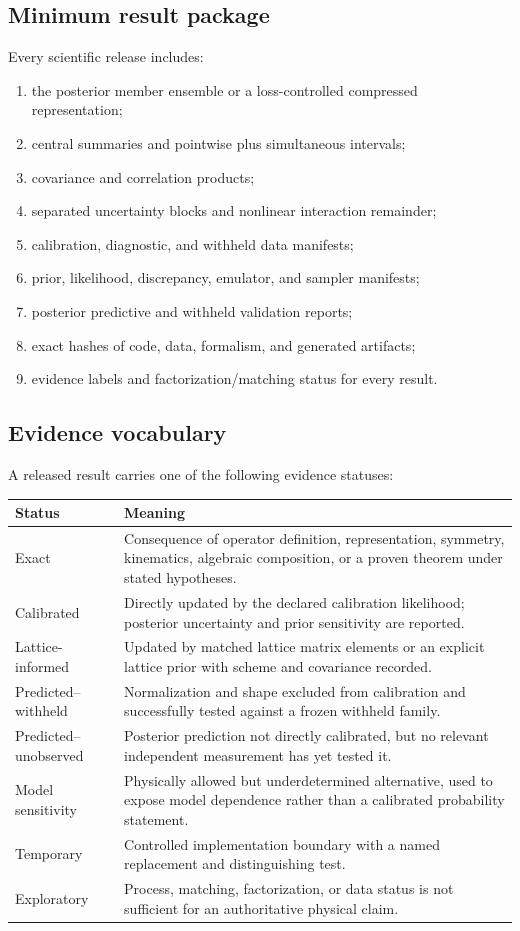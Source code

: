 \documentclass[11pt]{article}
\begin{document}
\subsection{Minimum result package}

Every scientific release includes:
\begin{enumerate}
\item the posterior member ensemble or a loss-controlled compressed
representation;
\item central summaries and pointwise plus simultaneous intervals;
\item covariance and correlation products;
\item separated uncertainty blocks and nonlinear interaction remainder;
\item calibration, diagnostic, and withheld data manifests;
\item prior, likelihood, discrepancy, emulator, and sampler manifests;
\item posterior predictive and withheld validation reports;
\item exact hashes of code, data, formalism, and generated artifacts;
\item evidence labels and factorization/matching status for every result.
\end{enumerate}

\subsection{Evidence vocabulary}

A released result carries one of the following evidence statuses:
\begin{longtable}{L{0.18\textwidth}L{0.72\textwidth}}
\toprule
Status & Meaning\\
\midrule
\endhead
Exact &
Consequence of operator definition, representation, symmetry, kinematics,
algebraic composition, or a proven theorem under stated hypotheses.\\
Calibrated &
Directly updated by the declared calibration likelihood; posterior uncertainty
and prior sensitivity are reported.\\
Lattice-informed &
Updated by matched lattice matrix elements or an explicit lattice prior with
scheme and covariance recorded.\\
Predicted--withheld &
Normalization and shape excluded from calibration and successfully tested
against a frozen withheld family.\\
Predicted--unobserved &
Posterior prediction not directly calibrated, but no relevant independent
measurement has yet tested it.\\
Model sensitivity &
Physically allowed but underdetermined alternative, used to expose model
dependence rather than a calibrated probability statement.\\
Temporary &
Controlled implementation boundary with a named replacement and distinguishing
test.\\
Exploratory &
Process, matching, factorization, or data status is not sufficient for an
authoritative physical claim.\\
\bottomrule
\end{longtable}
\end{document}
